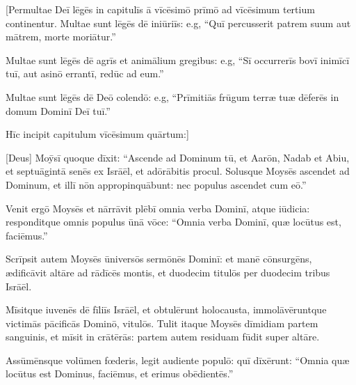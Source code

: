 

\vspace*{-1.4cm}
\thispagestyle{empty}

[Permultae Deī lēgēs in capitulīs ā vīcēsimō prīmō ad vīcēsimum tertium
continentur. Multae sunt lēgēs dē iniūriīs: e.g, ``Quī percusserit patrem
suum aut mātrem, morte moriātur.''

Multae sunt lēgēs dē agrīs et animālium
gregibus: e.g, ``Sī occurrerīs bovī inimīcī tuī, aut asinō errantī, redūc
ad eum.''

Multae sunt lēgēs dē Deō colendō: e.g, ``Prīmitiās frūgum terræ
tuæ dēferēs in domum Dominī Deī tuī.''

Hīc incipit
capitulum vīcēsimum quārtum:]

[Deus] Moȳsī quoque dīxit: ``Ascende ad Dominum
tū, et Aarōn, Nadab et Abiu, et septuāgintā senēs ex
Isrāēl, et adōrābitis procul.
Solusque
Moysēs ascendet ad Dominum, et illī nōn appropinquābunt:
nec populus ascendet cum eō.''

Venit ergō Moysēs et nārrāvit
plēbī omnia verba Dominī, atque
iūdicia:
responditque omnis populus ūnā vōce: ``Omnia verba Dominī, quæ locūtus est,
faciēmus.''

Scrīpsit autem Moysēs ūniversōs sermōnēs Dominī: et manē
cōnsurgēns, ædificāvit altāre ad
rādīcēs montis,
et duodecim titulōs per duodecim tribus
Isrāēl. 

Mīsitque iuvenēs dē fīliīs Isrāēl, et obtulērunt
holocausta,
immolāvēruntque victimās pācificās Dominō, vitulōs.  
Tulit itaque Moysēs
dīmidiam partem sanguinis, et mīsit in crātērās: partem
autem residuam fūdit super altāre. 

Assūmēnsque volūmen fœderis, legit audiente populō: quī
dīxērunt: ``Omnia quæ locūtus est Dominus, faciēmus, et erimus
obēdientēs.''

